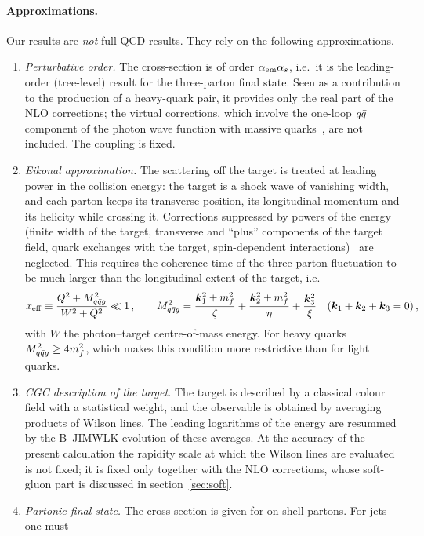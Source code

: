 \paragraph{Approximations.} Our results are \emph{not} full QCD results. They rely on the following
approximations.
\begin{enumerate}
\item \emph{Perturbative order.} The cross-section is of order $\alpha_{\rm em}\alpha_s$, i.e.\ it is the leading-order
(tree-level) result for the three-parton final state. Seen as a contribution to the production of a
heavy-quark pair, it provides only the real part of the NLO corrections; the virtual corrections,
which involve the one-loop $q\bar q$ component of the photon wave function with massive
quarks~\cite{Beuf:2021qqa,Beuf:2021srj,Beuf:2022ndu}, are not included. The coupling is fixed.
\item \emph{Eikonal approximation.} The scattering off the target is treated at leading power in the
collision energy: the target is a shock wave of vanishing width, and each parton keeps its transverse
position, its longitudinal momentum and its helicity while crossing it. Corrections suppressed by
powers of the energy (finite width of the target, transverse and ``plus'' components of the target
field, quark exchanges with the target, spin-dependent
interactions)~\cite{Altinoluk:2014oxa,Kovchegov:2015pbl} are neglected. This requires the coherence
time of the three-parton fluctuation to be much larger than the longitudinal extent of the target, i.e.
\begin{equation}
x_{\rm eff}\equiv\frac{Q^2+M_{q\bar q g}^2}{W^2+Q^2}\ll1\,,\qquad
M_{q\bar q g}^2=\frac{\bm{k}_1^2+m_f^2}{\zeta}+\frac{\bm{k}_2^2+m_f^2}{\eta}+\frac{\bm{k}_3^2}{\xi}
\quad(\bm{k}_1+\bm{k}_2+\bm{k}_3=0)\,,
\end{equation}
with $W$ the photon--target centre-of-mass energy. For heavy quarks $M_{q\bar q g}^2\geq4m_f^2$, which
makes this condition more restrictive than for light quarks.
\item \emph{CGC description of the target.} The target is described by a classical colour field with a
statistical weight, and the observable is obtained by averaging products of Wilson lines. The
leading logarithms of the energy are resummed by the B--JIMWLK evolution of these averages. At the
accuracy of the present calculation the rapidity scale at which the Wilson lines are evaluated is not
fixed; it is fixed only together with the NLO corrections, whose soft-gluon part is discussed in
section~\ref{sec:soft}.
\item \emph{Partonic final state.} The cross-section is given for on-shell partons. For jets one must

\end{enumerate}
